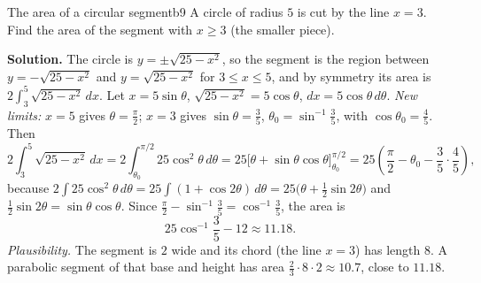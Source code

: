 \documentclass[11pt]{article}
\begin{document}
\begin{exmp}{The area of a circular segment}{b9}
A circle of radius $5$ is cut by the line $x=3$. Find the area of the segment with $x\ge3$ (the smaller piece).

\textbf{Solution.} The circle is $y=\pm\sqrt{25-x^2}$, so the segment is the region between $y=-\sqrt{25-x^2}$ and $y=\sqrt{25-x^2}$ for $3\le x\le5$, and by symmetry its area is $2\int_3^5\sqrt{25-x^2}\,dx$. Let $x=5\sin\theta$, $\sqrt{25-x^2}=5\cos\theta$, $dx=5\cos\theta\,d\theta$. \emph{New limits:} $x=5$ gives $\theta=\frac\pi2$; $x=3$ gives $\sin\theta=\frac35$, $\theta_0=\sin^{-1}\frac35$, with $\cos\theta_0=\frac45$. Then
\[2\int_3^5\sqrt{25-x^2}\,dx=2\int_{\theta_0}^{\pi/2}25\cos^2\theta\,d\theta=25\Big[\theta+\sin\theta\cos\theta\Big]_{\theta_0}^{\pi/2}=25\left(\frac\pi2-\theta_0-\frac35\cdot\frac45\right),\]
because $2\int25\cos^2\theta\,d\theta=25\int(1+\cos2\theta)\,d\theta=25\big(\theta+\frac12\sin2\theta\big)$ and $\frac12\sin2\theta=\sin\theta\cos\theta$. Since $\frac\pi2-\sin^{-1}\frac35=\cos^{-1}\frac35$, the area is
\[25\cos^{-1}\frac35-12\approx11.18 .\]
\emph{Plausibility.} The segment is $2$ wide and its chord (the line $x=3$) has length $8$. A parabolic segment of that base and height has area $\frac23\cdot8\cdot2\approx10.7$, close to $11.18$.
\end{exmp}
\end{document}
